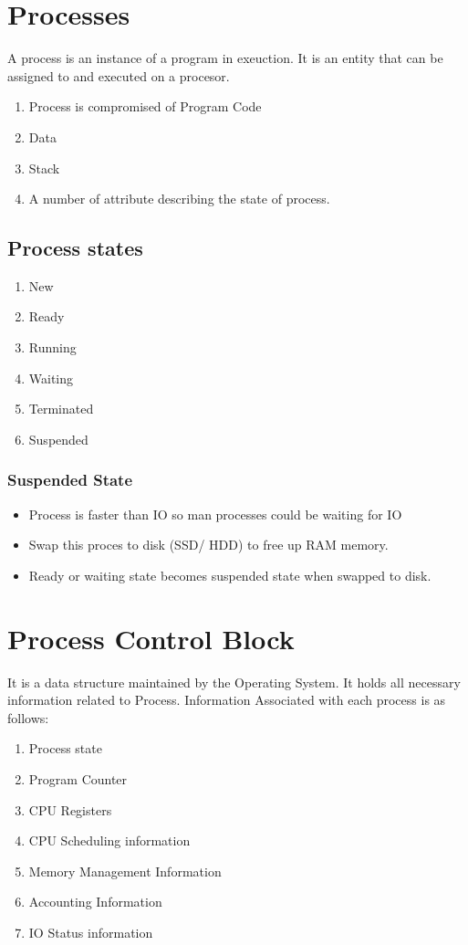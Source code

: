 \documentclass[11pt]{article}
\begin{document}
\clearpage
\tableofcontents
\clearpage


\section{Processes}

A process is an instance of a program in exeuction. It is an entity that can be assigned to and executed on a procesor.

\begin{enumerate}
	\item Process is compromised of Program Code
	\item Data
	\item Stack
	\item A number of attribute describing the state of process.
\end{enumerate}

\subsection{Process states}
\begin{enumerate}
	\item New
	\item Ready
	\item Running
	\item Waiting
	\item Terminated
	\item Suspended
\end{enumerate}


\subsubsection{Suspended State}
\begin{itemize}
	\item Process is faster than IO so man processes could be waiting for IO
	\item Swap this proces to disk (SSD/ HDD) to free up RAM memory.
	\item Ready or waiting state becomes suspended state when swapped to disk.
\end{itemize}

\section{Process Control Block}
It is a data structure maintained by the Operating System. It holds all necessary information related to Process.
Information Associated with each process is as follows:
\begin{enumerate}
	\item Process state
	\item Program Counter
	\item CPU Registers
	\item CPU Scheduling information
	\item Memory Management Information
	\item Accounting Information
	\item IO Status information
\end{enumerate}
\end{document}
